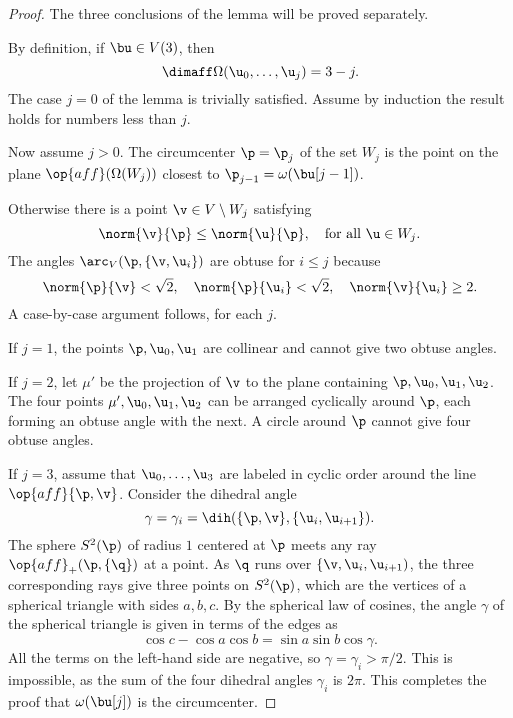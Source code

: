 \begin{proof} The three conclusions of the lemma will be proved
separately.

%
 By definition, if $\bu\in V(3)$, then
\begin{displaymath}\dimaff\Omega( \u_0,\ldots, \u_j) = 3-j.\end{displaymath}  The case $j=0$ of the lemma is trivially
satisfied.  Assume by induction the result holds for numbers less than
$j$.

Now assume $j>0$.  The circumcenter $\p=\p_{j}$ of the set $W_{j}$ is
the point on the plane $\op{aff}(\Omega(W_{j}))$ closest to
$\p_{j-1}=\omega(\bu[j-1])$.

   Otherwise
there is a point $\v\in V\setminus W_j$ satisfying
\begin{equation}\label{eqn:closest}
\norm{\v}{\p}\le \norm{ \u}{\p}, \quad\text{for all }  \u\in W_j.
\end{equation}
The angles $\arc_V(\p,\{\v, \u_i\})$ are obtuse for $i\le j$ because
\begin{displaymath}
\norm{\p}{\v} < \sqrt2,\quad \norm{\p}{ \u_i} <\sqrt2,\quad \norm{\v}{ \u_i} \ge 2.
\end{displaymath} 
A case-by-case argument follows, for each $j$.

If $j=1$, the points $\p, \u_0, \u_1$ are collinear and cannot give
two obtuse angles.

If $j=2$, let $\mu'$ be the projection of $\v$ to the plane containing
$\p, \u_0, \u_1, \u_2$. The four points $\mu', \u_0, \u_1, \u_2$ can
be arranged cyclically around $\p$, each forming an obtuse angle with
the next.  A circle around $\p$ cannot give four obtuse angles.


If $j=3$, assume that $ \u_0,\ldots, \u_3$ are labeled in cyclic order
around the line $\op{aff}\{\p,\v\}$.  Consider the dihedral angle
\begin{displaymath}
\gamma=\gamma_i=\dih(\{\p,\v\},\{ \u_i, \u_{i+1}\}).
\end{displaymath}
The sphere $S^2(\p)$ of radius $1$ centered at $\p$ meets any ray
$\op{aff}_+(\p,\{\q\})$ at a point.  As $\q$ runs over $\{\v, \u_i,
\u_{i+1})$, the three corresponding rays give three points on
$S^2(\p)$, which are the vertices of a spherical triangle with sides
$a,b,c$.  By the spherical law of cosines, the angle $\gamma$ of the
spherical triangle is given in terms of the edges as
\begin{displaymath}
\cos c - \cos a \cos b = \sin a \sin b \cos \gamma.
\end{displaymath}
All the terms on the left-hand side are negative, so $\gamma =\gamma_i
> \pi/2$.  This is impossible, as the sum of the four dihedral angles
$\gamma_i$ is $2\pi$.  This completes the proof that $\omega(\bu[j])$
is the circumcenter.


\end{proof}
